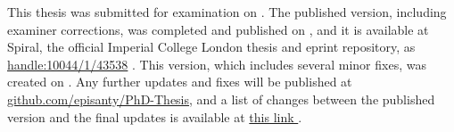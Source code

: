 \vspace{6mm}
\noindent
This thesis was submitted for examination on \submittedversiondate. 
The published version, including examiner corrections, was completed and published on \finalversiondate,
and it is available at Spiral, the official Imperial College London thesis and eprint repository, as
\href{http://hdl.handle.net/10044/1/43538}{handle:10044/1/43538}%
.
%
This version, which includes several minor fixes, was created on \compilationdate.
Any further updates and fixes will be published at 
\href{https://github.com/episanty/PhD-Thesis}{github.com/episanty/PhD-Thesis}, 
and a list of changes between the published version and the final updates is available at
\href{https://github.com/episanty/PhD-Thesis/commits/master}{%
  this link%
  }.








































